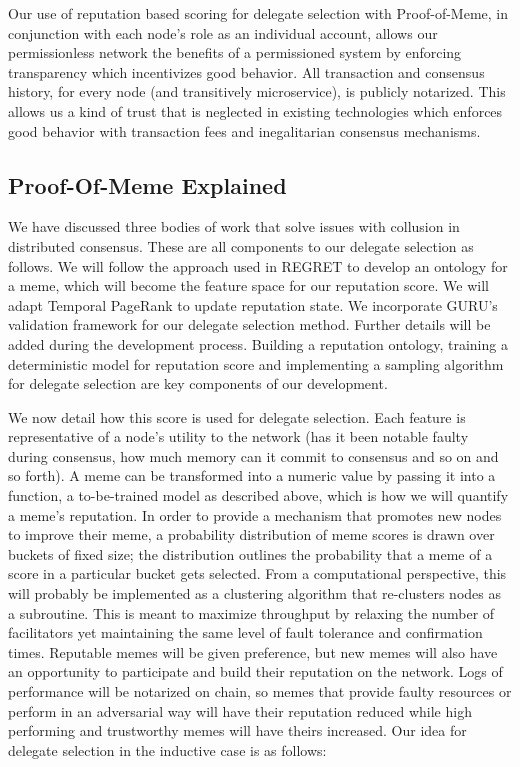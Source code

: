 \documentclass{article}
\begin{document}
Our use of reputation based scoring for delegate selection with Proof-of-Meme, in conjunction with each node's role as an individual account, allows our permissionless network the benefits of a permissioned system by enforcing transparency which incentivizes good behavior. All transaction and consensus history, for every node (and transitively microservice), is publicly notarized. This allows us a kind of trust that is neglected in existing technologies which enforces good behavior with transaction fees and inegalitarian consensus mechanisms.

\subsection{Proof-Of-Meme Explained}
We have discussed three bodies of work that solve issues with collusion in distributed consensus. These are all components to our delegate selection as follows. We will follow the approach used in REGRET to develop an ontology for a meme, which will become the feature space for our reputation score. We will adapt Temporal PageRank to update reputation state. We incorporate GURU's validation framework for our delegate selection method. Further details will be added during the development process. Building a reputation ontology, training a deterministic model for reputation score and implementing a sampling algorithm for delegate selection are key components of our development.

We now detail how this score is used for delegate selection. Each feature is representative of a node's utility to the network (has it been notable faulty during consensus, how much memory can it commit to consensus and so on and so forth). A meme can be transformed into a numeric value by passing it into a function, a to-be-trained model as described above, which is how we will quantify a meme's reputation. In order to provide a mechanism that promotes new nodes to improve their meme, a probability distribution of meme scores is drawn over buckets of fixed size; the distribution outlines the probability that a meme of a score in a particular bucket gets selected. From a computational perspective, this will probably be implemented as a clustering algorithm that re-clusters nodes as a subroutine. This is meant to maximize throughput by relaxing the number of facilitators yet maintaining the same level of fault tolerance and confirmation times. Reputable memes will be given preference, but new memes will also have an opportunity to participate and build their reputation on the network. Logs of performance will be notarized on chain, so memes that provide faulty resources or perform in an adversarial way will have their reputation reduced while high performing and trustworthy memes will have theirs increased. Our idea for delegate selection in the inductive case is as follows:
\end{document}
